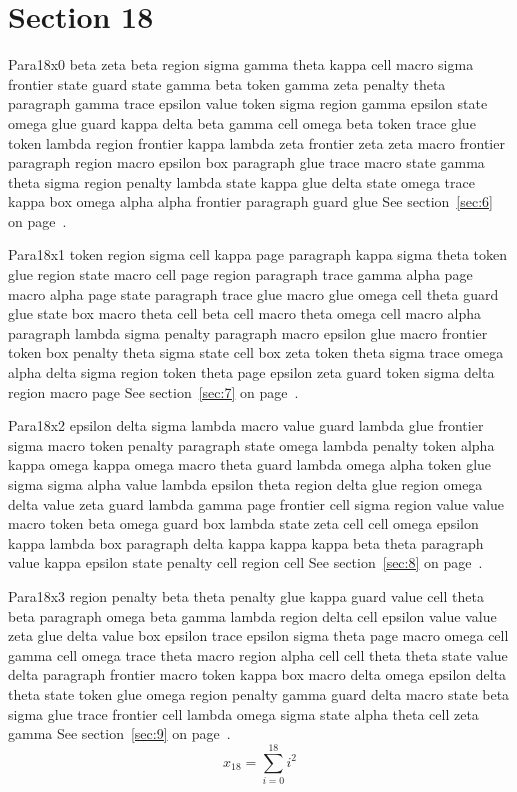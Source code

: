 \documentclass{article}
\begin{document}
\section{Section 18}\label{sec:18}
Para18x0 beta zeta beta region sigma gamma theta kappa cell macro sigma frontier state guard state gamma beta token gamma zeta penalty theta paragraph gamma trace epsilon value token sigma region gamma epsilon state omega glue guard kappa delta beta gamma cell omega beta token trace glue token lambda region frontier kappa lambda zeta frontier zeta zeta macro frontier paragraph region macro epsilon box paragraph glue trace macro state gamma theta sigma region penalty lambda state kappa glue delta state omega trace kappa box omega alpha alpha frontier paragraph guard glue See section~\ref{sec:6} on page~\pageref{sec:14}.

Para18x1 token region sigma cell kappa page paragraph kappa sigma theta token glue region state macro cell page region paragraph trace gamma alpha page macro alpha page state paragraph trace glue macro glue omega cell theta guard glue state box macro theta cell beta cell macro theta omega cell macro alpha paragraph lambda sigma penalty paragraph macro epsilon glue macro frontier token box penalty theta sigma state cell box zeta token theta sigma trace omega alpha delta sigma region token theta page epsilon zeta guard token sigma delta region macro page See section~\ref{sec:7} on page~\pageref{sec:15}.

Para18x2 epsilon delta sigma lambda macro value guard lambda glue frontier sigma macro token penalty paragraph state omega lambda penalty token alpha kappa omega kappa omega macro theta guard lambda omega alpha token glue sigma sigma alpha value lambda epsilon theta region delta glue region omega delta value zeta guard lambda gamma page frontier cell sigma region value value macro token beta omega guard box lambda state zeta cell cell omega epsilon kappa lambda box paragraph delta kappa kappa kappa beta theta paragraph value kappa epsilon state penalty cell region cell See section~\ref{sec:8} on page~\pageref{sec:16}.

Para18x3 region penalty beta theta penalty glue kappa guard value cell theta beta paragraph omega beta gamma lambda region delta cell epsilon value value zeta glue delta value box epsilon trace epsilon sigma theta page macro omega cell gamma cell omega trace theta macro region alpha cell cell theta theta state value delta paragraph frontier macro token kappa box macro delta omega epsilon delta theta state token glue omega region penalty gamma guard delta macro state beta sigma glue trace frontier cell lambda omega sigma state alpha theta cell zeta gamma See section~\ref{sec:9} on page~\pageref{sec:17}.
\begin{equation} x_{18} = \sum_{i=0}^{18} i^2 \label{eq:18}\end{equation}
\end{document}
